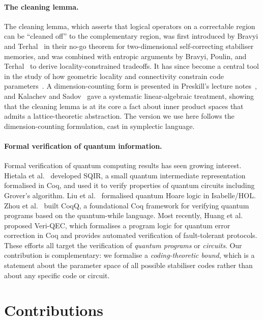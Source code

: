 \documentclass[11pt]{article}
\theoremstyle{plain}
\theoremstyle{definition}
\begin{document}
\paragraph{The cleaning lemma.}
The cleaning lemma, which asserts that logical operators on a correctable region can be
``cleaned off'' to the complementary region, was first introduced by Bravyi and
Terhal~\cite{BravyiTerhal2009} in their no-go theorem for two-dimensional self-correcting
stabiliser memories, and was combined with entropic arguments by Bravyi, Poulin, and
Terhal~\cite{BravyiPoulinTerhal2010} to derive locality-constrained tradeoffs.  It has since
become a central tool in the study of how geometric locality and connectivity constrain code
parameters~\cite{BaspinGuruswamiKrishnaLi2023,DaiLi2024}.  A dimension-counting form is
presented in Preskill's lecture notes~\cite{Preskill2022TopologicalStabilizerCodes}, and
Kalachev and Sadov~\cite{KalachevSadov2022} gave a systematic linear-algebraic treatment,
showing that the cleaning lemma is at its core a fact about inner product spaces that admits a
lattice-theoretic abstraction.  The version we use here follows the dimension-counting
formulation, cast in symplectic language.

\paragraph{Formal verification of quantum information.}
Formal verification of quantum computing results has seen growing interest.  Hietala et
al.~\cite{SQIR2021} developed SQIR, a small quantum intermediate representation formalised in
Coq, and used it to verify properties of quantum circuits including Grover's algorithm.  Liu
et al.~\cite{QHLProver2019} formalised quantum Hoare logic in Isabelle/HOL.  Zhou et
al.~\cite{CoqQ2023} built CoqQ, a foundational Coq framework for verifying quantum programs
based on the quantum-while language.  Most recently, Huang et
al.~\cite{VeriQEC2025} proposed Veri-QEC, which formalises a program logic for quantum error
correction in Coq and provides automated verification of fault-tolerant protocols.  These
efforts all target the verification of \emph{quantum programs} or \emph{circuits}.  Our
contribution is complementary: we formalise a \emph{coding-theoretic bound}, which is a
statement about the parameter space of all possible stabiliser codes rather than about any
specific code or circuit.


\section{Contributions}\label{sec:contributions}
\end{document}
